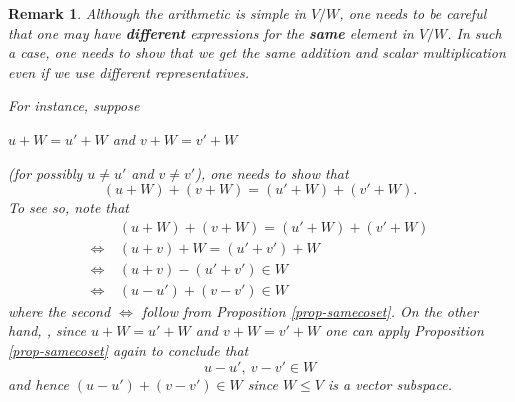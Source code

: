 \documentclass[12pt]{amsbook}
\newtheorem{remark}[theorem]{Remark}
\begin{document}
\begin{remark}
    Although the arithmetic is simple in $V/W$, one needs to be careful that one may have {\bf different} expressions for the {\bf same} element in $V/W$. In such a case, one needs to show that we get the same addition and scalar multiplication even if we use different representatives.

    For instance, suppose 
    \begin{center}
        $u + W = u' + W$ \quad and \quad $v + W = v'+W$ 
    \end{center}
    (for possibly $u \neq u'$ and $v \neq v'$), one needs to show that
    $$(u+W)+(v+W) = (u'+W) + (v'+W).$$
    To see so, note that
    \begin{align*}
    &(u+W)+(v+W) = (u'+W) + (v'+W) \\
      \Leftrightarrow\ &(u+v) + W = (u'+v') +W   \\
      \Leftrightarrow\ &(u+v)-(u'+v') \in W   \\
      \Leftrightarrow\ &(u-u')+(v-v') \in W   
    \end{align*}
    where the second $\Leftrightarrow$ follow from Proposition \ref{prop-samecoset}. On the other hand,
    , since $u + W = u' + W$ and $v + W = v'+W$ one can apply Proposition \ref{prop-samecoset} again to conclude that
    $$u - u',\ v-v' \in W$$
    and hence $(u-u')+(v-v') \in W$ since $W \leq V$ is a vector subspace.
\end{remark}
\end{document}
